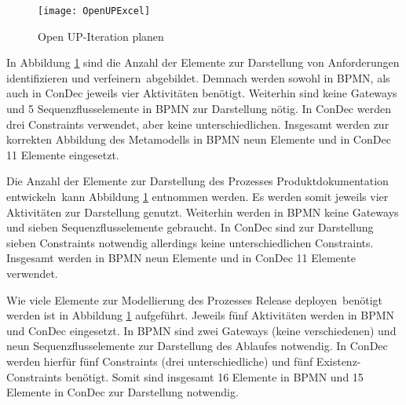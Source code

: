 \begin{figure}[htp]
\begin{center}
  \texttt{[image: OpenUPExcel]} %
  \caption{Open UP-Iteration planen}
  \label{fig:OpenUPExcel}
\end{center}
\end{figure}

In Abbildung \ref{fig:OpenUPExcel} sind die Anzahl der Elemente zur Darstellung von \grqq Anforderungen identifizieren und verfeinern\grqq \ abgebildet. Demnach werden sowohl in BPMN, als auch in ConDec jeweils vier Aktivitäten benötigt. Weiterhin sind keine Gateways und 5 Sequenzflusselemente in BPMN zur Darstellung nötig. In ConDec werden drei Constraints verwendet, aber keine unterschiedlichen. Insgesamt werden zur korrekten Abbildung des Metamodells in BPMN neun Elemente und in ConDec 11 Elemente eingesetzt.\newline


Die Anzahl der Elemente zur Darstellung des Prozesses \grqq Produktdokumentation entwickeln\grqq \ kann Abbildung \ref{fig:OpenUPExcel} entnommen werden. Es werden somit jeweils vier Aktivitäten zur Darstellung genutzt. Weiterhin werden in BPMN keine Gateways und sieben Sequenzflusselemente gebraucht. In ConDec sind zur Darstellung sieben Constraints notwendig allerdings keine unterschiedlichen Constraints. Insgesamt werden in BPMN neun Elemente und in ConDec 11 Elemente verwendet.\newline


Wie viele Elemente zur Modellierung des Prozesses \grqq Release deployen\grqq \ benötigt werden ist in Abbildung \ref{fig:OpenUPExcel} aufgeführt. Jeweils fünf Aktivitäten werden in BPMN und ConDec eingesetzt. In BPMN sind zwei Gateways (keine verschiedenen) und neun Sequenzflusselemente zur Darstellung des Ablaufes notwendig. In ConDec werden hierfür fünf Constraints (drei unterschiedliche)  und fünf Existenz-Constraints benötigt. Somit sind insgesamt 16 Elemente in BPMN und 15 Elemente in ConDec zur Darstellung notwendig. \newline


